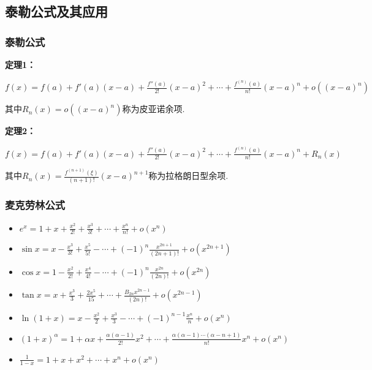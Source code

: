 \documentclass[12pt , a4paper , oneside]{ctexart}
\begin{document}
        \subsection{泰勒公式及其应用}
            \subsubsection{泰勒公式}
            \textbf{定理1：}
            \begin{mdframed}
            $f(x) = f(a) + f'(a)(x-a) + \frac{f''(a)}{2!}(x-a)^2 + \cdots + \frac{f^{(n)}(a)}{n!}(x-a)^n + o((x-a)^n)$
            \end{mdframed}
            其中$R_n(x) = o((x-a)^n)$称为皮亚诺余项.          
            
            \textbf{定理2：}
            \begin{mdframed}
            $f(x) = f(a) + f'(a)(x-a) + \frac{f''(a)}{2!}(x-a)^2 + \cdots + \frac{f^{(n)}(a)}{n!}(x-a)^n + R_n(x)$      
            \end{mdframed}          
            其中$R_n(x)=\frac{f^{(n+1)} (\xi)}{(n+1)!}(x-a)^{n+1}$称为拉格朗日型余项.

            \subsubsection{麦克劳林公式}
            \begin{itemize}
                \item $e^x = 1 + x + \frac{x^2}{2!} + \frac{x^3}{3!} + \cdots + \frac{x^n}{n!} + o(x^n)$
                \item $\sin x = x - \frac{x^3}{3!} + \frac{x^5}{5!} - \cdots + (-1)^n \frac{x^{2n+1}}{(2n+1)!} + o(x^{2n+1})$
                \item $\cos x = 1 - \frac{x^2}{2!} + \frac{x^4}{4!} - \cdots + (-1)^n \frac{x^{2n}}{(2n)!} + o(x^{2n})$
                \item $\tan x = x + \frac{x^3}{3} + \frac{2x^5}{15} + \cdots + \frac{B_{2n} x^{2n-1}}{(2n)!} + o(x^{2n-1})$
                \item $\ln(1+x) = x - \frac{x^2}{2} + \frac{x^3}{3} - \cdots + (-1)^{n-1} \frac{x^n}{n} + o(x^n)$
                \item $(1+x)^\alpha = 1 + \alpha x + \frac{\alpha(\alpha-1)}{2!}x^2 + \cdots + \frac{\alpha(\alpha-1)\cdots(\alpha-n+1)}{n!}x^n + o(x^n)$
                \item $\frac{1}{1-x} = 1 + x + x^2 + \cdots + x^n + o(x^n)$
            \end{itemize}
        
\end{document}
